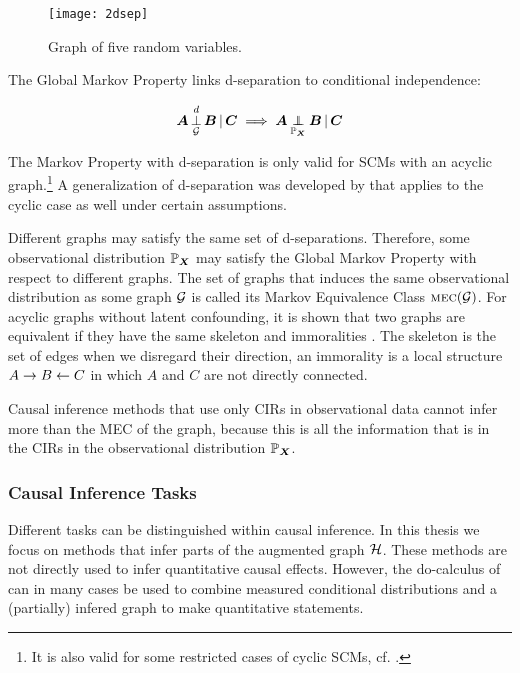 \begin{figure}[h]
    \centering
    \texttt{[image: 2dsep]}
    \caption{Graph of five random variables.}
    \label{fig:2:dsep}
\end{figure}

The Global Markov Property links d-separation to conditional independence:

$$\dsep{\B{A}}{\B{B}}{\B{C}}{\C{G}} \implies \indep{\B{A}}{\B{B}}{\B{C}}{\Prb_{\B{X}}}$$

The Markov Property with d-separation is only valid for SCMs with an acyclic graph.\footnote{It is also valid for some restricted cases of cyclic SCMs, cf. \citet{forre2017markov}.} A generalization of d-separation was developed by \citet{forre2017markov} that applies to the cyclic case as well under certain assumptions.

Different graphs may satisfy the same set of d-separations. Therefore, some observational distribution $\Prb_{\B{X}}$ may satisfy the Global Markov Property with respect to different graphs. The set of graphs that induces the same observational distribution as some graph $\C{G}$ is called its Markov Equivalence Class $\mec(\C{G})$. For acyclic graphs without latent confounding, it is shown that two graphs are equivalent if they have the same skeleton and immoralities \citep{verma1991equivalence}. The skeleton is the set of edges when we disregard their direction, an immorality is a local structure $A\to B \ot C$ in which $A$ and $C$ are not directly connected.

Causal inference methods that use only CIRs in observational data cannot infer more than the MEC of the graph, because this is all the information that is in the CIRs in the observational distribution $\Prb_{\B{X}}$.


\subsubsection{Causal Inference Tasks}
Different tasks can be distinguished within causal inference. In this thesis we focus on methods that infer parts of the augmented graph $\C{H}$. These methods are not directly used to infer quantitative causal effects. However, the do-calculus of \citet{pearl2009causality} can in many cases be used to combine measured conditional distributions and a (partially) infered graph to make quantitative statements.

